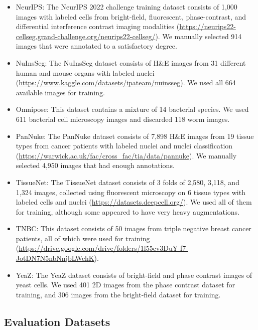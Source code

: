 \begin{itemize}
  \item NeurIPS: The NeurIPS 2022 challenge training dataset consists of 1,000 images with labeled cells from bright-field, fluorescent, phase-contrast, and differential interference contrast imaging modalities 
  (\url{https://neurips22-cellseg.grand-challenge.org/neurips22-cellseg/}). 
  We manually selected 914 images that were annotated to a satisfactory degree.

  \item NuInsSeg: The NuInsSeg dataset consists of H\&E images from 31 different human and mouse organs with labeled nuclei 
  (\url{https://www.kaggle.com/datasets/ipateam/nuinsseg}). 
  We used all 664 available images for training.

  \item Omnipose: This dataset contains a mixture of 14 bacterial species. We used 611 bacterial cell
microscopy images and discarded 118 worm images.

  \item PanNuke: The PanNuke dataset consists of 7,898 H\&E images from 19 tissue types from cancer patients with labeled nuclei and nuclei classification 
  (\url{https://warwick.ac.uk/fac/cross_fac/tia/data/pannuke}). 
  We manually selected 4,950 images that had enough annotations.

  \item TissueNet: The TissueNet dataset consists of 3 folds of 2,580, 3,118, and 1,324 images, collected using fluorescent microscopy on 6 tissue types with labeled cells and nuclei 
  (\url{https://datasets.deepcell.org/}). 
  We used all of them for training, although some appeared to have very heavy augmentations.

  \item TNBC: This dataset consists of 50 images from triple negative breast cancer patients, all of which were used for training 
  (\url{https://drive.google.com/drive/folders/1l55cv3DuY-f7-JotDN7N5nbNnjbLWchK}).

  \item YeaZ: The YeaZ dataset consists of bright-field and phase contrast images of yeast cells. We used 401 2D images from the phase contrast dataset for training, and 306 images from the bright-field dataset for training.
\end{itemize}

\subsection{Evaluation Datasets}

